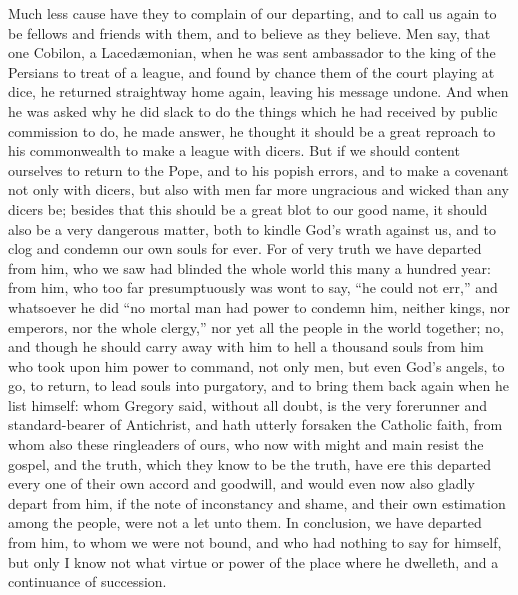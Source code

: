 Much less cause have they to complain of our departing, and to call
us again to be fellows and friends with them, and to believe as they
believe. Men say, that one Cobilon, a Lacedæmonian, when
he was sent ambassador to the king of the Persians to treat of a league,
and found by chance them of the court playing at dice, he returned straightway
home again, leaving his message undone. And when he was asked
why he did slack to do the things which he had received by public commission
to do, he made answer, he thought it should be a great reproach to his
commonwealth to make a league with dicers. But if we should content
ourselves to return to the Pope, and to his popish errors, and to make
a covenant not only with dicers, but also with men far more ungracious
and wicked than any dicers be; besides that this should be a great blot
to our good name, it should also be a very dangerous matter, both to
kindle God’s wrath against us, and to clog and condemn our own
souls for ever. For of very truth we have departed from him, who
we saw had blinded the whole world this many a hundred year: from him,
who too far presumptuously was wont to say, “he could
not err,” and whatsoever he did “no mortal man had power
to condemn him, neither kings, nor emperors, nor the whole clergy,”
nor yet all the people in the world together; no, and though he should
carry away with him to hell a thousand souls from him who took upon
him power to command, not only men, but even God’s angels, to
go, to return, to lead souls into purgatory, and to bring them back
again when he list himself: whom Gregory said, without all doubt, is
the very forerunner and standard-bearer of Antichrist, and hath utterly
forsaken the Catholic faith, from whom also these ringleaders of ours,
who now with might and main resist the gospel, and the truth, which
they know to be the truth, have ere this departed every one of their
own accord and goodwill, and would even now also gladly depart from
him, if the note of inconstancy and shame, and their own estimation
among the people, were not a let unto them. In conclusion, we
have departed from him, to whom we were not bound, and who had nothing
to say for himself, but only I know not what virtue or power of the
place where he dwelleth, and a continuance of succession.

